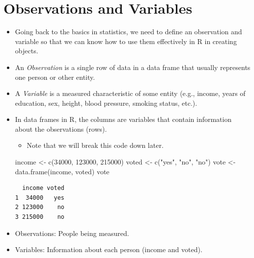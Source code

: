 \documentclass[
  letterpaper,
  DIV=11,
  numbers=noendperiod]{scrreprt}
\newenvironment{Shaded}{\begin{snugshade}}{\end{snugshade}}
\newcommand{\DecValTok}[1]{\textcolor[rgb]{0.68,0.00,0.00}{#1}}
\newcommand{\FunctionTok}[1]{\textcolor[rgb]{0.28,0.35,0.67}{#1}}
\newcommand{\NormalTok}[1]{\textcolor[rgb]{0.00,0.23,0.31}{#1}}
\newcommand{\OtherTok}[1]{\textcolor[rgb]{0.00,0.23,0.31}{#1}}
\newcommand{\StringTok}[1]{\textcolor[rgb]{0.13,0.47,0.30}{#1}}
\providecommand{\tightlist}{%
  \setlength{\itemsep}{0pt}\setlength{\parskip}{0pt}}\usepackage{longtable,booktabs,array}
\begin{document}

\chapter{Observations and Variables}\label{observations-and-variables}

\begin{itemize}
\item
  Going back to the basics in statistics, we need to define an
  observation and variable so that we can know how to use them
  effectively in R in creating objects.
\item
  An \emph{Observation} is a single row of data in a data frame that
  usually represents one person or other entity.
\item
  A \emph{Variable} is a measured characteristic of some entity (e.g.,
  income, years of education, sex, height, blood pressure, smoking
  status, etc.).
\item
  In data frames in R, the columns are variables that contain
  information about the observations (rows).

  \begin{itemize}
  \tightlist
  \item
    Note that we will break this code down later.
  \end{itemize}

\begin{Shaded}
\begin{Highlighting}[]
\NormalTok{income }\OtherTok{\textless{}{-}} \FunctionTok{c}\NormalTok{(}\DecValTok{34000}\NormalTok{, }\DecValTok{123000}\NormalTok{, }\DecValTok{215000}\NormalTok{)}
\NormalTok{voted }\OtherTok{\textless{}{-}} \FunctionTok{c}\NormalTok{(}\StringTok{"yes"}\NormalTok{, }\StringTok{"no"}\NormalTok{, }\StringTok{"no"}\NormalTok{)}
\NormalTok{vote }\OtherTok{\textless{}{-}} \FunctionTok{data.frame}\NormalTok{(income, voted)}
\NormalTok{vote}
\end{Highlighting}
\end{Shaded}

\begin{verbatim}
  income voted
1  34000   yes
2 123000    no
3 215000    no
\end{verbatim}
\item
  Observations: People being measured.
\item
  Variables: Information about each person (income and voted).
\end{itemize}
\end{document}
